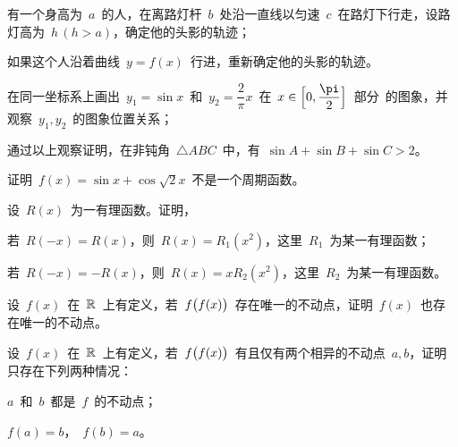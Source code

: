 \begin{exercise*}
\item\relax
\begin{exlist}
  \item 有一个身高为~$a$~的人，在离路灯杆~$b$~处沿一直线以匀速~$c$~在路灯下行走，设路灯高为~$h\,(h>a)$，确定他的头影的轨迹；
  \item 如果这个人沿着曲线~$y=f(x)$~行进，重新确定他的头影的轨迹。
\end{exlist}
\item\relax
\begin{exlist}
  \item 在同一坐标系上画出~$y_1=\sin x$~和~$y_2=\dfrac2\pi x$~在~$x\in\Brack[\Big]{0,\dfrac\pi2}$~部分~的图象，并
        观察~$y_1,y_2$~的图象位置关系；
  \item 通过以上观察证明，在非钝角~$\triangle\mathit{ABC}$~中，有~$\sin A+\sin B+\sin C>2$。
\end{exlist}
\item 证明~$f(x)=\sin x+\cos\sqrt 2x$~不是一个周期函数。
\item 设~$R(x)$~为一有理函数。证明，
\begin{exlist}
  \item 若~$R(-x)=R(x)$，则~$R(x)=R_1(x^2)$，这里~$R_1$~为某一有理函数；
  \item 若~$R(-x)=-R(x)$，则~$R(x)=x R_2(x^2)$，这里~$R_2$~为某一有理函数。
\end{exlist}
\item 设~$f(x)$~在~$\mathbb{R}$~上有定义，若~$f\bigl\lparen f(x)\bigr\rparen$~存在唯一的不动点，证明~$f(x)$~也存在唯一的不动点。
\item 设~$f(x)$~在~$\mathbb{R}$~上有定义，若~$f\bigl\lparen f(x)\bigr\rparen$~有且仅有两个相异的不动点~$a,b$，证明只存在下列两种情况：
\begin{exlistcols}
  \item $a$~和~$b$~都是~$f$~的不动点；
  \item $f(a)=b$，~$f(b)=a$。
\end{exlistcols}
\end{exercise*}




\endinput
